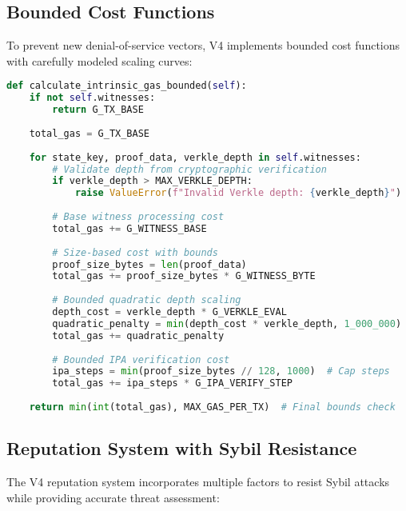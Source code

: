 \documentclass{article}
\begin{document}
\subsection{Bounded Cost Functions}

To prevent new denial-of-service vectors, V4 implements bounded cost functions with carefully modeled scaling curves:

\begin{lstlisting}[language=Python,caption={Bounded Gas Calculation},label={lst:bounded}]
def calculate_intrinsic_gas_bounded(self):
    if not self.witnesses:
        return G_TX_BASE
    
    total_gas = G_TX_BASE
    
    for state_key, proof_data, verkle_depth in self.witnesses:
        # Validate depth from cryptographic verification
        if verkle_depth > MAX_VERKLE_DEPTH:
            raise ValueError(f"Invalid Verkle depth: {verkle_depth}")
        
        # Base witness processing cost
        total_gas += G_WITNESS_BASE
        
        # Size-based cost with bounds
        proof_size_bytes = len(proof_data)
        total_gas += proof_size_bytes * G_WITNESS_BYTE
        
        # Bounded quadratic depth scaling
        depth_cost = verkle_depth * G_VERKLE_EVAL
        quadratic_penalty = min(depth_cost * verkle_depth, 1_000_000)  # Cap penalty
        total_gas += quadratic_penalty
        
        # Bounded IPA verification cost
        ipa_steps = min(proof_size_bytes // 128, 1000)  # Cap steps
        total_gas += ipa_steps * G_IPA_VERIFY_STEP
    
    return min(int(total_gas), MAX_GAS_PER_TX)  # Final bounds check
\end{lstlisting}

\subsection{Reputation System with Sybil Resistance}

The V4 reputation system incorporates multiple factors to resist Sybil attacks while providing accurate threat assessment:
\end{document}
